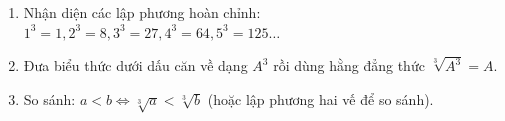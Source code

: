 \begin{enumerate}
\item Nhận diện các lập phương hoàn chỉnh: $1^3 = 1, 2^3 = 8, 3^3 = 27, 4^3 = 64, 5^3 = 125\dots$
\item Đưa biểu thức dưới dấu căn về dạng $A^3$ rồi dùng hằng đẳng thức $\sqrt[3]{A^3} = A$.
\item So sánh: $a < b \iff \sqrt[3]{a} < \sqrt[3]{b}$ (hoặc lập phương hai vế để so sánh).
\end{enumerate}
